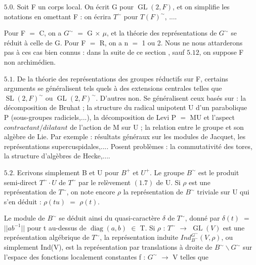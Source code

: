 \documentclass[10pt,a4paper]{article}
\begin{document}
\clearpage
{}
\label{d035-physical-021}
\par\medskip{}\par\smallskip
\par $5.0$. Soit F un corps local. On écrit G pour $\operatorname{GL}(2,F)$, et on simplifie les notations en omettant F : on écrira $T^\sim$ pour $T(F)^\sim$, ....\par
\par Pour F $=$ C, on a $G^\sim$ $=$ G $\times{}$ $\mu{}$, et la théorie des représentations de $G^\sim$ se réduit à celle de G. Pour F $=$ R, on a n $=$ 1 ou 2. Nous ne nous attarderons pas à ces cas bien connus : dans la suite de ce section , sauf $5.12$, on suppose F non archimédien.\par
\par $5.1$. De la théorie des représentations des groupes réductifs sur F, certains arguments se généralisent tels quels à des extensions centrales telles que $\operatorname{SL}(2,F)^\sim$ ou $\operatorname{GL}(2,F)^\sim$. D'autres non. Se généralisent ceux basés sur : la décomposition de Bruhat ; la structure du radical unipotent U d'un parabolique P (sous-groupes radiciels,...), la décomposition de Levi P $=$ MU et l'aspect $contractant/dilatant$ de l'action de M sur U ; la relation entre le groupe et son algèbre de Lie. Par exemple : résultats généraux sur les modules de Jacquet, les représentations supercuspidales,.... Posent problèmes : la commutativité des tores, la structure d'algèbres de Hecke,....\par
\par $5.2$. Ecrivons simplement B et U pour $B^+$ et $U^+$. Le groupe $B^\sim$ est le produit semi-direct $T^\sim\cdot{}U$ de $T^\sim$ par le relèvement $(1.7)$ de U. Si $\rho{}$ est une représentation de $T^\sim$, on note encore $\rho{}$ la représentation de $B^\sim$ triviale sur U qui s'en déduit : $\rho{}(tu)$ $=$ $\rho{}(t)$.\par
\par Le module de $B^\sim$ se déduit ainsi du quasi-caractère $\delta{}$ de $T^\sim$, donné par $\delta{}(t)$ $=$ $||ab^{-1}||$ pour t au-dessus de $\operatorname{diag}(a,b)$ $\in{}$ T. Si $\rho{}$ : $T^\sim$ $\to{}$ $\operatorname{GL}(V)$ est une représentation algébrique de $T^\sim$, la représentation induite $Ind_{B^\sim}^{G^\sim}(V,\rho{})$, ou simplement Ind(V), est la représentation par translations à droite de $B^\sim\backslash G^\sim$ sur l'espace des fonctions localement constantes f : $G^\sim$ $\to{}$ V telles que\par
\end{document}

